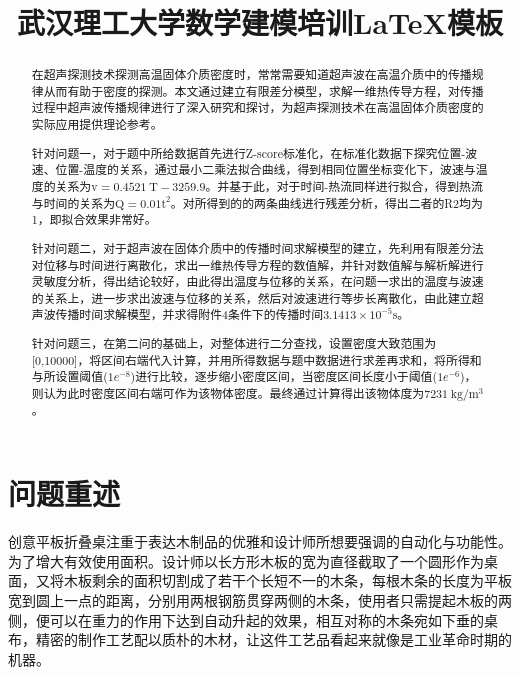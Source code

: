 \documentclass[fontset=windows]{whutmod}
\title{武汉理工大学数学建模培训\LaTeX 模板}
\begin{document}
\maketitle

\begin{abstract}
	在超声探测技术探测高温固体介质密度时，常常需要知道超声波在高温介质中的传播规律从而有助于密度的探测。本文通过建立有限差分模型，求解一维热传导方程，对传播过程中超声波传播规律进行了深入研究和探讨，为超声探测技术在高温固体介质密度的实际应用提供理论参考。
	
	针对问题一，对于题中所给数据首先进行{\heiti Z-score标准化}，在标准化数据下探究位置-波速、位置-温度的关系，通过{\heiti 最小二乘法拟合}曲线，得到相同位置坐标变化下，波速与温度的关系为$\mathrm{v}=0.4521 \mathrm{~T}-3259.9$。并基于此，对于时间-热流同样进行拟合，得到热流与时间的关系为$\mathrm{Q}=0.01 \mathrm{t}^{2}$。对所得到的的两条曲线进行残差分析，得出二者的R2均为1，即拟合效果非常好。
	
	针对问题二，对于超声波在固体介质中的传播时间求解模型的建立，先利用{\heiti 有限差分法}对位移与时间进行离散化，求出一维热传导方程的数值解，并针对数值解与解析解进行灵敏度分析，得出结论较好，由此得出温度与位移的关系，在问题一求出的温度与波速的关系上，进一步求出波速与位移的关系，然后对波速进行等步长离散化，由此建立超声波传播时间求解模型，并求得附件4条件下的传播时间\( 3.1413 \times 10^{-5} \)s。
	
	针对问题三，在第二问的基础上，对整体进行{\heiti 二分查找}，设置密度大致范围为[0,10000]，将区间右端代入计算，并用所得数据与题中数据进行求差再求和，将所得和与所设置阈值($1 e^{-8}$)进行比较，逐步缩小密度区间，当密度区间长度小于阈值($1 e^{-6}$)，则认为此时密度区间右端可作为该物体密度。最终通过计算得出该物体度为$7231 \mathrm{~kg} / \mathrm{m}^{3}$。
	
	                                    
\end{abstract}

\tableofcontents
\newpage

\section{问题重述}

创意平板折叠桌注重于表达木制品的优雅和设计师所想要强调的自动化与功能性。为了增大有效使用面积。设计师以长方形木板的宽为直径截取了一个圆形作为桌面，又将木板剩余的面积切割成了若干个长短不一的木条，每根木条的长度为平板宽到圆上一点的距离，分别用两根钢筋贯穿两侧的木条，使用者只需提起木板的两侧，便可以在重力的作用下达到自动升起的效果，相互对称的木条宛如下垂的桌布，精密的制作工艺配以质朴的木材，让这件工艺品看起来就像是工业革命时期的机器。
\end{document}
